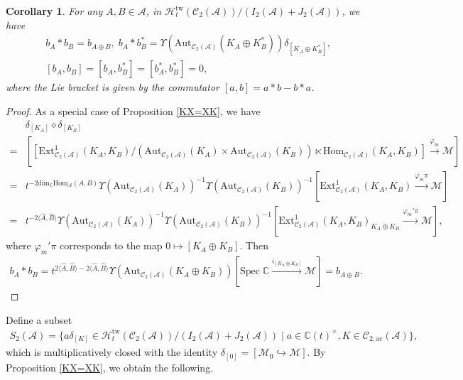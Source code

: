\documentclass[12pt]{amsart}
\newtheorem{corollary}[theorem]{Corollary}
\theoremstyle{definition}
\numberwithin{equation}{section}
\begin{document}
\begin{corollary}
    \label{bAbB}
    For any $ A,B \in \mathcal{A} $, in $ \mathcal{H}_t^{\mathrm{tw}}(\mathcal{C}_2(\mathcal{A}))/(I_2(\mathcal{A})+J_2(\mathcal{A})) $, we have
    \begin{align*}
        &b_A * b_B = b_{A \oplus B},\;b_A * b_B^* = \Upsilon(\mathrm{Aut}_{\mathcal{C}_2(\mathcal{A})}(K_A \oplus K_B^*))\delta_{[K_A \oplus K_B^*]},\\
        &[b_A,b_B] = [b_A,b_B^*] = [b_A^*,b_B^*]=0,
    \end{align*}
    where the Lie bracket is given by the commutator $ [a,b] = a * b - b * a $.
\end{corollary}
\begin{proof}
  As a special case of Proposition \ref{KX=XK}, we have
  \begin{align*}
      &\delta_{[K_A]} \diamond \delta_{[K_B]} \\
      =& [[\mathrm{Ext}^1_{\mathcal{C}_2(\mathcal{A})}(K_A,K_B)/(\mathrm{Aut}_{\mathcal{C}_2(\mathcal{A})}(K_A) \times \mathrm{Aut}_{\mathcal{C}_2(\mathcal{A})}(K_B)) \ltimes \mathrm{Hom}_{\mathcal{C}_2(\mathcal{A})}(K_A, K_B)] \xrightarrow{\varphi_m} \mathcal{M}] \\
      =& t^{-2\mathrm{dim}_{\mathbb{C}}\mathrm{Hom}_{\mathcal{A}}(A,B)} \Upsilon(\mathrm{Aut}_{\mathcal{C}_2(\mathcal{A})}(K_A))^{-1}\Upsilon(\mathrm{Aut}_{\mathcal{C}_2(\mathcal{A})}(K_B))^{-1}[\mathrm{Ext}^1_{\mathcal{C}_2(\mathcal{A})}(K_A,K_B) \xrightarrow{\varphi_m \pi} \mathcal{M}]  \\
      =& t^{-2\langle \widehat{A}, \widehat{B} \rangle}\Upsilon(\mathrm{Aut}_{\mathcal{C}_2(\mathcal{A})}(K_A))^{-1}\Upsilon(\mathrm{Aut}_{\mathcal{C}_2(\mathcal{A})}(K_B))^{-1} [\mathrm{Ext}^1_{\mathcal{C}_2(\mathcal{A})}(K_A,K_B)_{K_A \oplus K_B} \xrightarrow{\varphi_m' \pi} \mathcal{M}], 
  \end{align*}
  where $ \varphi_m' \pi $ corresponds to the map $ 0 \mapsto [K_A \oplus K_B]  $. 
  Then
  \begin{align*}
      b_A * b_B = t^{2\langle \widehat{A}, \widehat{B} \rangle-2\langle \widehat{A}, \widehat{B} \rangle}\Upsilon(\mathrm{Aut}_{\mathcal{C}_2(\mathcal{A})}(K_A \oplus K_B))[\mathrm{Spec}\; \mathbb{C} \xrightarrow{i_{[K_A \oplus K_B]}} \mathcal{M}] = b_{ A\oplus B}.
  \end{align*}
\end{proof}

Define a subset
\begin{align*}
    S_2(\mathcal{A}) = \{a\delta_{[K]} \in \mathcal{H}_t^{\mathrm{tw}}(\mathcal{C}_2(\mathcal{A}))/(I_2(\mathcal{A})+J_2(\mathcal{A}))\mid a \in \mathbb{C}(t)^{\times}, K \in \mathcal{C}_{2,\mathrm{ac}}(\mathcal{A})\},
\end{align*}
which is multiplicatively closed with the identity $ \delta_{[0]} = [\mathcal{M}_0 \hookrightarrow \mathcal{M} ] $. 
By Proposition \ref{KX=XK}, we obtain the following.
\end{document}
